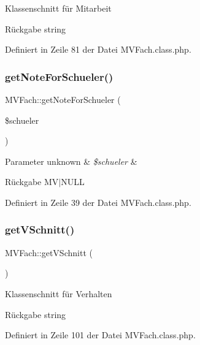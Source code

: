 Klassenschnitt für Mitarbeit \begin{DoxyReturn}{Rückgabe}
string 
\end{DoxyReturn}


Definiert in Zeile 81 der Datei M\+V\+Fach.\+class.\+php.

\mbox{\label{class_m_v_fach_a104b7ee3fd0b05b84ad4ee6b698d2152}} 
\subsubsection{\texorpdfstring{get\+Note\+For\+Schueler()}{getNoteForSchueler()}}
{\footnotesize\ttfamily M\+V\+Fach\+::get\+Note\+For\+Schueler (\begin{DoxyParamCaption}\item[{}]{\$schueler }\end{DoxyParamCaption})}


\begin{DoxyParams}[1]{Parameter}
unknown & {\em \$schueler} & \\
\hline
\end{DoxyParams}
\begin{DoxyReturn}{Rückgabe}
M\+V$\vert$\+N\+U\+LL 
\end{DoxyReturn}


Definiert in Zeile 39 der Datei M\+V\+Fach.\+class.\+php.

\mbox{\label{class_m_v_fach_a288515118682a13a0f292db7b3522aed}} 
\subsubsection{\texorpdfstring{get\+V\+Schnitt()}{getVSchnitt()}}
{\footnotesize\ttfamily M\+V\+Fach\+::get\+V\+Schnitt (\begin{DoxyParamCaption}{ }\end{DoxyParamCaption})}

Klassenschnitt für Verhalten \begin{DoxyReturn}{Rückgabe}
string 
\end{DoxyReturn}


Definiert in Zeile 101 der Datei M\+V\+Fach.\+class.\+php.

